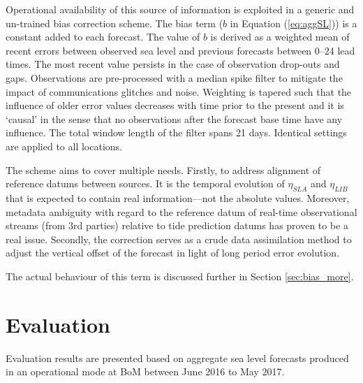 Operational availability of this source of information is exploited in a generic and un-trained bias correction scheme. 
The bias term ($b$ in Equation (\ref{eq:aggSL})) is a constant added to each forecast.
The value of $b$ is derived as a weighted mean of recent errors between observed sea level and previous forecasts between 0--24 lead times.
The most recent value persists in the case of observation drop-outs and gaps.
Observations are pre-processed with a median spike filter to mitigate the impact of communications glitches and noise.
Weighting is tapered such that the influence of older error values decreases with time prior to the present and it is `causal' in the sense that no observations after the forecast base time have any influence.
The total window length of the filter spans 21 days.
Identical settings are applied to all locations.


The scheme aims to cover multiple needs.
Firstly, to address alignment of reference datums between sources. 
It is the temporal evolution of $\eta_{SLA}$ and $\eta_{LIB}$ that is expected to contain real information---not the absolute values.
Moreover, metadata ambiguity with regard to the reference datum of real-time observational streams (from 3rd parties) relative to tide prediction datums has proven to be a real issue.
Secondly, the correction serves as a crude data assimilation method to adjust the vertical offset of the forecast in light of long period error evolution. 

The actual behaviour of this term is discussed further in Section \ref{sec:bias_more}.

\section{Evaluation}

Evaluation results are presented based on aggregate sea level forecasts produced in an operational mode at BoM between June 2016 to May 2017.

